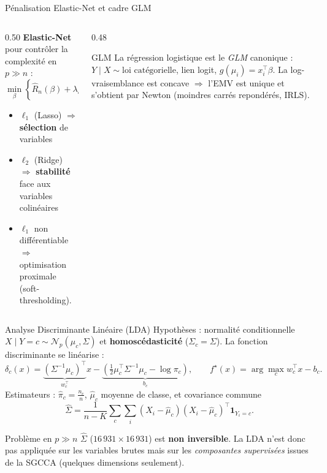 \documentclass[aspectratio=169, 10pt]{beamer}
\begin{document}
\begin{frame}{Pénalisation Elastic-Net et cadre GLM}
  \begin{columns}[T]
    \begin{column}{0.50\textwidth}
      \textbf{Elastic-Net} pour contrôler la complexité en $p \gg n$ :
      \[
        \min_\beta \left\{ \hat{R}_n(\beta) + \lambda\rho\|\beta\|_1 + \frac{\lambda(1-\rho)}{2}\|\beta\|_2^2 \right\}
      \]
      \vspace{0.2cm}
      \begin{itemize}
        \item $\ell_1$ (Lasso) $\Rightarrow$ \textbf{sélection} de variables
        \item $\ell_2$ (Ridge) $\Rightarrow$ \textbf{stabilité} face aux variables colinéaires
        \item $\ell_1$ non différentiable $\Rightarrow$ optimisation proximale (soft-thresholding).
      \end{itemize}
    \end{column}

    \begin{column}{0.48\textwidth}
      \begin{block}{GLM}
        La régression logistique est le \textit{GLM} canonique : $Y \mid X \sim \text{loi catégorielle}$, lien logit, $g(\mu_i) = x_i^\top \beta$. La log-vraisemblance est concave $\Rightarrow$ l'EMV est unique et s'obtient par Newton (moindres carrés repondérés, IRLS).
      \end{block}
    \end{column}
  \end{columns}
\end{frame}

\begin{frame}{Analyse Discriminante Linéaire (LDA)}
  Hypothèses : normalité conditionnelle $X \mid Y = c \sim \mathcal{N}_p(\mu_c, \Sigma)$ et \textbf{homoscédasticité} ($\Sigma_c = \Sigma$). La fonction discriminante se linéarise :
  \[
    \delta_c(x) = \underbrace{(\Sigma^{-1}\mu_c)^\top}_{w_c^\top} x - \underbrace{\left(\tfrac{1}{2}\mu_c^\top \Sigma^{-1}\mu_c - \log \pi_c\right)}_{b_c}, \qquad f^\star(x) = \arg\max_c w_c^\top x - b_c.
  \]
  Estimateurs : $\hat{\pi}_c = \frac{n_c}{n}$, $\hat{\mu}_c$ moyenne de classe, et covariance commune
  \[
    \hat{\Sigma} = \frac{1}{n-K} \sum_c \sum_i (X_i - \hat{\mu}_c)(X_i - \hat{\mu}_c)^\top \mathbf{1}_{Y_i = c}.
  \]

  \medskip
  \begin{alertblock}{Problème en $p \gg n$}
    $\hat{\Sigma}$ ($16\,931 \times 16\,931$) est \textbf{non inversible}. La LDA n'est donc pas appliquée sur les variables brutes mais sur les \textit{composantes supervisées} issues de la SGCCA (quelques dimensions seulement).
  \end{alertblock}
\end{frame}
\end{document}
